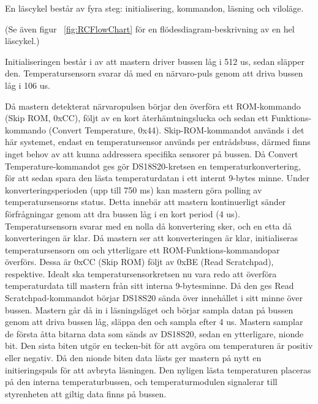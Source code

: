 \documentclass[a4paper,11pt]{article}
\begin{document}
	En läscykel består av fyra steg: initialisering, kommandon, läsning och viloläge.

	(Se även figur ~\ref{fig:RCFlowChart} för en flödesdiagram-beskrivning av en hel läscykel.)

	Initialiseringen består i av att mastern driver bussen låg i 512 us, sedan släpper den.
	Temperatursensorn svarar då med en närvaro-puls genom att driva bussen låg i 106 us.

	Då mastern detekterat närvaropulsen börjar den överföra ett ROM-kommando (Skip ROM, 0xCC), följt av en kort återhämtningslucka och sedan ett Funktions-kommando (Convert Temperature, 0x44).
	Skip-ROM-kommandot används i det här systemet, endast en temperatursensor används per entrådsbuss, därmed finns inget behov av att kunna addressera specifika sensorer på bussen.
	Då Convert Temperature-kommandot ges gör DS18S20-kretsen en temperaturkonvertering, för att sedan spara den lästa temperaturdatan i ett internt 9-bytes minne.
	Under konverteringsperioden (upp till 750 ms) kan mastern göra polling av temperatursensorns status. Detta innebär att mastern kontinuerligt
	sänder förfrågningar genom att dra bussen låg i en kort period (4 us). Temperatursensorn svarar med en nolla
	då konvertering sker, och en etta då konverteringen är klar.
	Då mastern ser att konverteringen är klar, initialiseras temperatursensorn om och ytterligare ett ROM-Funktions-kommandopar överförs. Dessa är 0xCC (Skip ROM) följt av 0xBE (Read Scratchpad), respektive.
	Idealt ska temperatursensorkretsen nu vara redo att överföra temperaturdata till mastern från sitt interna 9-bytesminne.
	Då den ges Read Scratchpad-kommandot börjar DS18S20 sända över innehållet i sitt minne över bussen.
	Mastern går då in i läsningsläget och börjar sampla datan på bussen genom att driva bussen låg, släppa den och sampla efter 4 us.
	Mastern samplar de första åtta bitarna data som sänds av DS18S20, sedan en ytterligare, nionde bit. 
	Den sista biten utgör en tecken-bit för att avgöra om temperaturen är positiv eller negativ. Då den nionde biten data lästs
	ger mastern på nytt en initieringspuls för att avbryta läsningen.
	Den nyligen lästa temperaturen placeras på den interna temperaturbussen, och temperaturmodulen signalerar till styrenheten att giltig data finns på bussen.
\end{document}
